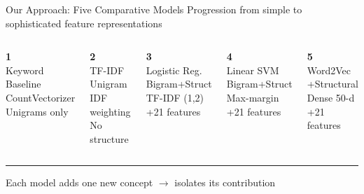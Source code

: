 \documentclass[aspectratio=169, 12pt]{beamer}
\begin{document}
\begin{frame}{Our Approach: Five Comparative Models}
\centering
\vspace{-4pt}
{\small\color{textMuted} Progression from simple to sophisticated feature representations}

\vspace{12pt}
\begin{columns}[T]
\centering
\textcolor{accentCyan}{\textbf{1}}\\[4pt]
{\small Keyword\\Baseline}\\[4pt]
{\scriptsize\color{textMuted} CountVectorizer\\Unigrams only}

\centering
\textcolor{accentCyan}{\textbf{2}}\\[4pt]
{\small TF-IDF\\Unigram}\\[4pt]
{\scriptsize\color{textMuted} IDF weighting\\No structure}

\centering
\textcolor{accentCyan}{\textbf{3}}\\[4pt]
{\small Logistic Reg.\\Bigram+Struct}\\[4pt]
{\scriptsize\color{textMuted} TF-IDF (1,2)\\+21 features}

\centering
\textcolor{accentCyan}{\textbf{4}}\\[4pt]
{\small Linear SVM\\Bigram+Struct}\\[4pt]
{\scriptsize\color{textMuted} Max-margin\\+21 features}

\centering
\textcolor{accentGreen}{\textbf{5}}\\[4pt]
{\small\textcolor{accentGreen}{Word2Vec}\\+Structural}\\[4pt]
{\scriptsize\color{textMuted} Dense 50-d\\+21 features}
\end{columns}

\vspace{16pt}
\textcolor{textMuted}{\rule{0.8\textwidth}{0.4pt}}
\vspace{6pt}

{\small Each model adds one new concept $\rightarrow$ isolates its contribution}
\end{frame}
\end{document}
